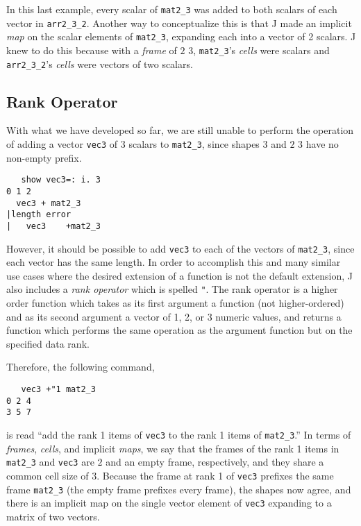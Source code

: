 In this last example, every scalar of \texttt{mat2\_3} was added to both scalars of each vector in \texttt{arr2\_3\_2}. 
Another way to conceptualize this is that J made an implicit \textit{map} on the scalar elements of \texttt{mat2\_3}, 
expanding each into a vector of 2 scalars.
J knew to do this because with a \textit{frame} of $2$ $3$, \texttt{mat2\_3}'s \textit{cells} were scalars and 
\texttt{arr2\_3\_2}'s \textit{cells} were vectors of two scalars.

\subsection{Rank Operator}
With what we have developed so far, we are still unable to perform the operation of 
adding a vector \texttt{vec3} of 3 scalars to \texttt{mat2\_3}, since shapes $3$ and $2$ $3$ have no non-empty prefix.

\begin{singlespacing}
\begin{small}
\begin{verbatim}
   show vec3=: i. 3
0 1 2
  vec3 + mat2_3
|length error
|   vec3    +mat2_3
\end{verbatim}
\end{small}
\end{singlespacing}

However, it should be possible to add \texttt{vec3} to each of the vectors of \texttt{mat2\_3}, since each vector has the same length.
In order to accomplish this and many similar use cases where the desired extension of a function is not the default extension, 
J also includes a \textit{rank operator} which is spelled \texttt{"}.
The rank operator is a higher order function which takes as its first argument a function (not higher-ordered) %
and as its second argument a vector of 1, 2, or 3 numeric values, 
and returns a function which performs the same operation as the argument function but on the specified data rank\cite{rankanduni}.

Therefore, the following command, 

\begin{singlespacing}
\begin{small}
\begin{verbatim}
   vec3 +"1 mat2_3
0 2 4
3 5 7
\end{verbatim}
\end{small}
\end{singlespacing}

is read ``add the rank 1 items of \texttt{vec3} to the rank 1 items of \texttt{mat2\_3}.''
In terms of \textit{frames}, \textit{cells}, and implicit \textit{maps}, we say that
the frames of the rank 1 items in \texttt{mat2\_3} and \texttt{vec3} are $2$ and an empty frame, respectively, and they share a common cell size of $3$.
Because the frame at rank 1 of \texttt{vec3} prefixes the same frame \texttt{mat2\_3} (the empty frame prefixes every frame), 
the shapes now agree, and there is an implicit map on the single vector element of \texttt{vec3} expanding to a matrix of two vectors.

